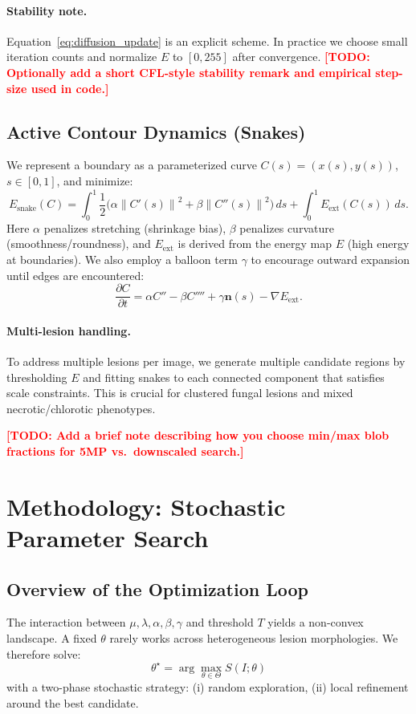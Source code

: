 \documentclass[journal]{IEEEtran}
\newcommand{\TODO}[1]{\textcolor{red}{\textbf{[TODO: #1]}}}
\newcommand{\grad}{\nabla}
\newcommand{\norm}[1]{\left\lVert #1 \right\rVert}
\begin{document}
\paragraph{Stability note.}
Equation~\eqref{eq:diffusion_update} is an explicit scheme. In practice we choose small iteration counts and normalize $E$ to $[0,255]$ after convergence. \TODO{Optionally add a short CFL-style stability remark and empirical step-size used in code.}

\subsection{Active Contour Dynamics (Snakes)}
We represent a boundary as a parameterized curve $C(s) = (x(s), y(s))$, $s\in[0,1]$, and minimize:
\begin{equation}
E_{\mathrm{snake}}(C) = \int_0^1 \frac{1}{2}\Big(\alpha \norm{C'(s)}^2 + \beta \norm{C''(s)}^2\Big)\,ds + \int_0^1 E_{\mathrm{ext}}(C(s))\,ds.
\end{equation}
Here $\alpha$ penalizes stretching (shrinkage bias), $\beta$ penalizes curvature (smoothness/roundness), and $E_{\mathrm{ext}}$ is derived from the energy map $E$ (high energy at boundaries). We also employ a balloon term $\gamma$ to encourage outward expansion until edges are encountered:
\begin{equation}
\frac{\partial C}{\partial t} = \alpha C'' - \beta C'''' + \gamma \mathbf{n}(s) - \grad E_{\mathrm{ext}}.
\end{equation}

\paragraph{Multi-lesion handling.}
To address multiple lesions per image, we generate multiple candidate regions by thresholding $E$ and fitting snakes to each connected component that satisfies scale constraints. This is crucial for clustered fungal lesions and mixed necrotic/chlorotic phenotypes.

\TODO{Add a brief note describing how you choose min/max blob fractions for 5MP vs.\ downscaled search.}

\section{Methodology: Stochastic Parameter Search}

\subsection{Overview of the Optimization Loop}
The interaction between $\mu,\lambda,\alpha,\beta,\gamma$ and threshold $T$ yields a non-convex landscape. A fixed $\theta$ rarely works across heterogeneous lesion morphologies. We therefore solve:
\begin{equation}
\theta^\star = \arg\max_{\theta\in\Theta} S(I;\theta)
\end{equation}
with a two-phase stochastic strategy: (i) random exploration, (ii) local refinement around the best candidate.
\end{document}
